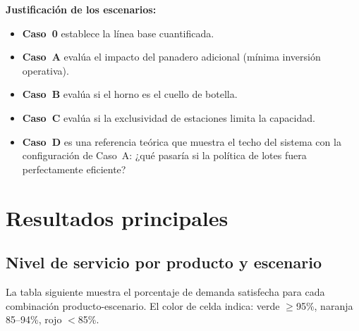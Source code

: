 \documentclass[12pt]{article}
\begin{document}
\medskip
\noindent\textbf{Justificación de los escenarios:}
\begin{itemize}
  \item \textbf{Caso~0} establece la línea base cuantificada.
  \item \textbf{Caso~A} evalúa el impacto del panadero adicional (mínima inversión operativa).
  \item \textbf{Caso~B} evalúa si el horno es el cuello de botella.
  \item \textbf{Caso~C} evalúa si la exclusividad de estaciones limita la capacidad.
  \item \textbf{Caso~D} es una referencia teórica que muestra el techo del sistema con la configuración de Caso~A: ¿qué pasaría si la política de lotes fuera perfectamente eficiente?
\end{itemize}

\newpage
\section{Resultados principales}

\subsection{Nivel de servicio por producto y escenario}

La tabla siguiente muestra el porcentaje de demanda satisfecha para cada combinación producto-escenario. El color de celda indica: \colorbox{verdeok!25}{verde} $\geq$95\%, \colorbox{naranja!30}{naranja} 85--94\%, \colorbox{rojoriesgo!20}{rojo} $<$85\%.
\end{document}
